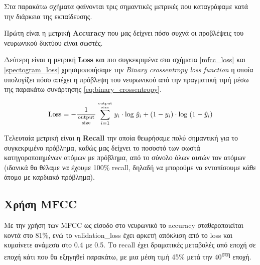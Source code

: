 \documentclass[../main.tex]{subfiles}
\begin{document}
Στα παρακάτω σχήματα φαίνονται τρις σημαντικές μετρικές που καταγράφαμε κατά την
διάρκεια της εκπαίδευσης.

Πρώτη είναι η μετρική \textbf{Accuracy} που μας δείχνει πόσο συχνά οι προβλέψεις
του νευρωνικού δικτύου είναι σωστές.

Δεύτερη είναι η μετρική \textbf{Loss} και πιο συγκεκριμένα στα σχήματα
\ref{mfcc_loss} και \ref{spectogram_loss} χρησιμοποιήσαμε την \textit{Binary
	crossentropy loss function} η οποία υπολογίζει πόσο απέχει η πρόβλεψη του
νευρωνικού από την πραγματική τιμή μέσω της παρακάτω συνάρτησης
\ref{eq:binary_crossentropy}.

\begin{equation}\label{eq:binary_crossentropy}
	\mathrm{Loss} = - \frac{1}{\mathrm{output \atop size}} \sum_{i=1}^{\mathrm{output \atop size}} y_i \cdot \mathrm{log}\; {\hat{y}}_i + (1-y_i) \cdot \mathrm{log}\; (1-{\hat{y}}_i)
\end{equation}

Τελευταία μετρική είναι η \textbf{Recall} την οποία θεωρήσαμε πολύ σημαντική για
το συγκεκριμένο πρόβλημα, καθώς μας δείχνει το ποσοστό των σωστά
κατηγοροποιημένων ατόμων με πρόβλημα, από το σύνολο όλων αυτών τον ατόμων
(ιδανικά θα θέλαμε να έχουμε 100\% recall, δηλαδή να μπορούμε να εντοπίσουμε
κάθε άτομο με καρδιακό πρόβλημα).

\subsection{Χρήση MFCC}

Με την χρήση των MFCC ως είσοδο στο νευρωνικό το accuracy σταθεροποιείται κοντά
στο 81\%, ενώ το validation\_loss έχει αρκετή απόκλιση από το loss και κυμαίνετε
ανάμεσα στο 0.4 με 0.5. Το recall έχει δραματικές μεταβολές από εποχή σε εποχή
κάτι που θα εξηγηθεί παρακάτω, με μια μέση τιμή 45\% μετά την
40\textsuperscript{στη} εποχή.
\end{document}
